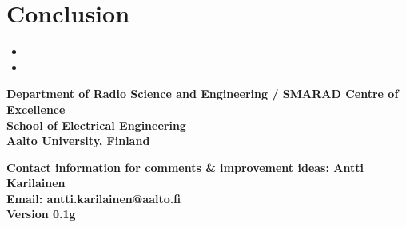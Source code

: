 \documentclass[portrait,a0,final]{a0poster} %
\newcommand{\sectionspace}{10mm} %
\begin{document}
\begin{minipage}{0.98\linewidth}
\begin{minipage}[t]{0.47\linewidth}
\lipsum[3-4]







\vspace{\sectionspace}
\section{Conclusion}

\begin{itemize}
	\item \lipsum[5]
	\item \lipsum[6]
\end{itemize}



{\footnotesize %





} %



\end{minipage}
\end{minipage} %





\vfill %


\begin{minipage}{0.95\linewidth} %


\footnotesize %


\begin{minipage}[t]{0.47\linewidth}%
\vspace{0pt}

\textsf{\textbf{Department of Radio Science and Engineering / SMARAD Centre of Excellence\\
School of Electrical Engineering\\
Aalto University, Finland}}

\end{minipage} %
\hspace{0.03\linewidth}
\begin{minipage}[t]{0.47\linewidth} %
\vspace{0pt}

\textsf{\textbf{Contact information for comments \& improvement ideas: Antti Karilainen\\
Email: antti.karilainen@aalto.fi\\
Version 0.1g}}
\end{minipage}



\end{minipage}




\vspace*{0.03\linewidth} %
\end{document}

